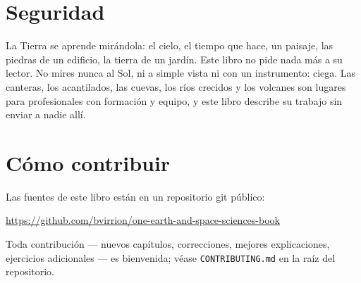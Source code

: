 \section*{Seguridad}

La Tierra se aprende mirándola: el cielo, el tiempo que hace, un paisaje,
las piedras de un edificio, la tierra de un jardín. Este libro no pide
nada más a su lector. No mires nunca al Sol, ni a simple vista ni
con un instrumento: ciega. Las canteras, los acantilados, las cuevas, los
ríos crecidos y los volcanes son lugares para profesionales con formación
y equipo, y este libro describe su trabajo sin enviar a nadie allí.

\section*{Cómo contribuir}

Las fuentes de este libro están en un repositorio git público:
\begin{center}
\url{https://github.com/bvirrion/one-earth-and-space-sciences-book}
\end{center}
Toda contribución --- nuevos capítulos, correcciones, mejores
explicaciones, ejercicios adicionales --- es bienvenida; véase
\texttt{CONTRIBUTING.md} en la raíz del repositorio.
